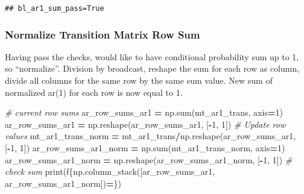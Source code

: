 \documentclass[
]{book}
\newenvironment{Shaded}{\begin{snugshade}}{\end{snugshade}}
\newcommand{\BuiltInTok}[1]{#1}
\newcommand{\CommentTok}[1]{\textcolor[rgb]{0.56,0.35,0.01}{\textit{#1}}}
\newcommand{\DecValTok}[1]{\textcolor[rgb]{0.00,0.00,0.81}{#1}}
\newcommand{\NormalTok}[1]{#1}
\newcommand{\OperatorTok}[1]{\textcolor[rgb]{0.81,0.36,0.00}{\textbf{#1}}}
\newcommand{\SpecialCharTok}[1]{\textcolor[rgb]{0.00,0.00,0.00}{#1}}
\newcommand{\SpecialStringTok}[1]{\textcolor[rgb]{0.31,0.60,0.02}{#1}}
\begin{document}
\begin{verbatim}
## bl_ar1_sum_pass=True
\end{verbatim}

\hypertarget{normalize-transition-matrix-row-sum}{%
\subsubsection{Normalize Transition Matrix Row Sum}\label{normalize-transition-matrix-row-sum}}

Having pass the checks, would like to have conditional probability sum up to 1, so ``normalize''. Division by broadcast, reshape the sum for each row as column, divide all columns for the same row by the same sum value. New sum of normalized ar(1) for each row is now equal to 1.

\begin{Shaded}
\begin{Highlighting}[]
\CommentTok{\# current row sums}
\NormalTok{ar\_row\_sums\_ar1 }\OperatorTok{=}\NormalTok{ np.}\BuiltInTok{sum}\NormalTok{(mt\_ar1\_trans, axis}\OperatorTok{=}\DecValTok{1}\NormalTok{)}
\NormalTok{ar\_row\_sums\_ar1 }\OperatorTok{=}\NormalTok{ np.reshape(ar\_row\_sums\_ar1, [}\OperatorTok{{-}}\DecValTok{1}\NormalTok{, }\DecValTok{1}\NormalTok{])}
\CommentTok{\# Update row values}
\NormalTok{mt\_ar1\_trans\_norm }\OperatorTok{=}\NormalTok{ mt\_ar1\_trans}\OperatorTok{/}\NormalTok{np.reshape(ar\_row\_sums\_ar1, [}\OperatorTok{{-}}\DecValTok{1}\NormalTok{, }\DecValTok{1}\NormalTok{])}
\NormalTok{ar\_row\_sums\_ar1\_norm }\OperatorTok{=}\NormalTok{ np.}\BuiltInTok{sum}\NormalTok{(mt\_ar1\_trans\_norm, axis}\OperatorTok{=}\DecValTok{1}\NormalTok{)}
\NormalTok{ar\_row\_sums\_ar1\_norm }\OperatorTok{=}\NormalTok{ np.reshape(ar\_row\_sums\_ar1\_norm, [}\OperatorTok{{-}}\DecValTok{1}\NormalTok{, }\DecValTok{1}\NormalTok{])}
\CommentTok{\# check sum}
\BuiltInTok{print}\NormalTok{(}\SpecialStringTok{f\textquotesingle{}}\SpecialCharTok{\{np.}\NormalTok{column\_stack([ar\_row\_sums\_ar1, ar\_row\_sums\_ar1\_norm])}\OperatorTok{=}\SpecialCharTok{\}}\SpecialStringTok{\textquotesingle{}}\NormalTok{)}
\end{Highlighting}
\end{Shaded}
\end{document}
